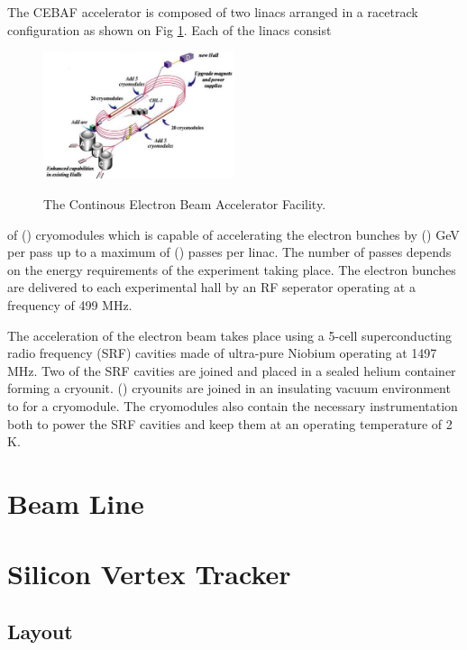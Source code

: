 The CEBAF accelerator is composed of two linacs arranged in a racetrack
configuration as shown on Fig \ref{fig:cebaf}. Each of the linacs consist
\begin{figure}[h]
    \centering
    \caption{The Continous Electron Beam Accelerator Facility.}
    \includegraphics[width=0.5\textwidth]{images/cebaf.jpg}
    \label{fig:cebaf}
\end{figure}
of () cryomodules which is capable of accelerating the electron bunches 
by () GeV per pass up to a maximum of () passes per linac.  The number of 
passes depends on the energy requirements of the experiment taking place.
The electron bunches are delivered to each experimental hall by an RF seperator
operating at a frequency of 499 MHz. 

The acceleration of the electron beam takes place using a 5-cell 
superconducting radio frequency (SRF) cavities made of ultra-pure Niobium 
operating at 1497 MHz.  Two of the SRF cavities are joined and placed in a 
sealed helium container forming a cryounit.  () cryounits are joined in an
insulating vacuum environment to for a cryomodule.  The cryomodules also
contain the necessary instrumentation both to power the SRF cavities and keep
them at an operating temperature of 2 K.

\section{Beam Line}

\section*{Silicon Vertex Tracker}

\subsection*{Layout}

